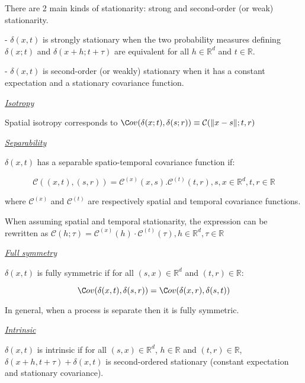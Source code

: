 There are 2 main kinds of stationarity: strong and second-order (or weak) stationarity.

- $\delta(x,t)$ is strongly stationary when the two probability measures defining $\delta(x;t)$ and $\delta(x+h;t+\tau)$ are equivalent for all $h \in \mathbb{R}^d$ and $t \in \mathbb{R}$.

- $\delta(x,t)$ is second-order (or weakly) stationary when it has a constant expectation and a stationary covariance function.

\vspace{\baselineskip}

\underline{\textit{Isotropy}}

Spatial isotropy corresponds to $\C ov(\delta(x;t),\delta(s;r)) \equiv \mathcal{C}(\|x-s\|;t,r)$ 

\vspace{\baselineskip}

\underline{\textit{Separability}}

$\delta(x,t)$ has a separable spatio-temporal covariance function if:

$$\mathcal{C}((x,t),(s,r)) = \mathcal{C}^{(x)}(x,s) . \mathcal{C}^{(t)}(t,r), s,x \in \mathbb{R}^d,t,r \in \mathbb{R}$$

where $\mathcal{C}^{(x)}$ and $\mathcal{C}^{(t)}$ are respectively spatial and temporal covariance functions.

When assuming spatial and temporal stationarity, the expression can be rewritten as $\mathcal{C}(h;\tau) = \mathcal{C}^{(x)}(h) \cdot \mathcal{C}^{(t)}(\tau), h \in \mathbb{R}^d, \tau \in \mathbb{R}$

\vspace{\baselineskip}

\underline{\textit{Full symmetry}}

$\delta(x,t)$ is fully symmetric if for all $(s,x) \in \mathbb{R}^d$ and $(t,r) \in \mathbb{R}$: 

$$\C ov(\delta(x,t),\delta(s,r))=\C ov(\delta(x,r),\delta(s,t))$$

In general, when a process is separate then it is fully symmetric.

\vspace{\baselineskip}

\underline{\textit{Intrinsic}}

$\delta(x,t)$ is intrinsic if for all $(s,x) \in \mathbb{R}^d$, $h \in \mathbb{R}$ and $(t,r) \in \mathbb{R}$, $\delta(x+h,t+\tau)+\delta(x,t)$ is second-ordered stationary (constant expectation and stationary covariance).

